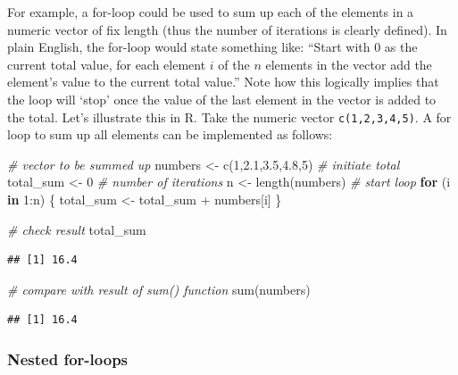 \documentclass[
  12pt,
]{style/krantz}
\newenvironment{Shaded}{\begin{snugshade}}{\end{snugshade}}
\newcommand{\CommentTok}[1]{\textcolor[rgb]{0.56,0.35,0.01}{\textit{#1}}}
\newcommand{\ControlFlowTok}[1]{\textcolor[rgb]{0.13,0.29,0.53}{\textbf{#1}}}
\newcommand{\DecValTok}[1]{\textcolor[rgb]{0.00,0.00,0.81}{#1}}
\newcommand{\FloatTok}[1]{\textcolor[rgb]{0.00,0.00,0.81}{#1}}
\newcommand{\FunctionTok}[1]{\textcolor[rgb]{0.00,0.00,0.00}{#1}}
\newcommand{\NormalTok}[1]{#1}
\newcommand{\OtherTok}[1]{\textcolor[rgb]{0.56,0.35,0.01}{#1}}
\newcommand{\SpecialCharTok}[1]{\textcolor[rgb]{0.00,0.00,0.00}{#1}}
\begin{document}
For example, a for-loop could be used to sum up each of the elements in a numeric vector of fix length (thus the number of iterations is clearly defined). In plain English, the for-loop would state something like: ``Start with 0 as the current total value, for each element \(i\) of the \(n\) elements in the vector add the element's value to the current total value.'' Note how this logically implies that the loop will `stop' once the value of the last element in the vector is added to the total. Let's illustrate this in R. Take the numeric vector \texttt{c(1,2,3,4,5)}. A for loop to sum up all elements can be implemented as follows:

\begin{Shaded}
\begin{Highlighting}[]
\CommentTok{\# vector to be summed up}
\NormalTok{numbers }\OtherTok{\textless{}{-}} \FunctionTok{c}\NormalTok{(}\DecValTok{1}\NormalTok{,}\FloatTok{2.1}\NormalTok{,}\FloatTok{3.5}\NormalTok{,}\FloatTok{4.8}\NormalTok{,}\DecValTok{5}\NormalTok{)}
\CommentTok{\# initiate total}
\NormalTok{total\_sum }\OtherTok{\textless{}{-}} \DecValTok{0}
\CommentTok{\# number of iterations}
\NormalTok{n }\OtherTok{\textless{}{-}} \FunctionTok{length}\NormalTok{(numbers)}
\CommentTok{\# start loop}
\ControlFlowTok{for}\NormalTok{ (i }\ControlFlowTok{in} \DecValTok{1}\SpecialCharTok{:}\NormalTok{n) \{}
\NormalTok{     total\_sum }\OtherTok{\textless{}{-}}\NormalTok{ total\_sum }\SpecialCharTok{+}\NormalTok{ numbers[i]}
\NormalTok{\}}

\CommentTok{\# check result}
\NormalTok{total\_sum}
\end{Highlighting}
\end{Shaded}

\begin{verbatim}
## [1] 16.4
\end{verbatim}

\begin{Shaded}
\begin{Highlighting}[]
\CommentTok{\# compare with result of sum() function}
\FunctionTok{sum}\NormalTok{(numbers)}
\end{Highlighting}
\end{Shaded}

\begin{verbatim}
## [1] 16.4
\end{verbatim}

\hypertarget{nested-for-loops}{%
\subsubsection{Nested for-loops}\label{nested-for-loops}}
\end{document}
